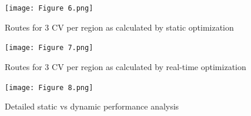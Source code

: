 \documentclass[12pt]{article}
\begin{document}
\newpage
\begin{figure}[H]
    \centering
    \texttt{[image: Figure 6.png]} %
    \caption{Routes for 3 CV per region as calculated by static optimization}\label{fig4}
\end{figure}
\newpage
\begin{figure}[H]
    \centering
    \texttt{[image: Figure 7.png]} %
    \caption{Routes for 3 CV per region as calculated by real-time optimization}\label{fig5}
\end{figure}


\newpage

\begin{figure}[H]
	\centering
	\texttt{[image: Figure 8.png]}\label{ABCD}
	\caption{Detailed static vs dynamic performance analysis}\label{figcg1}
\end{figure}
\end{document}

